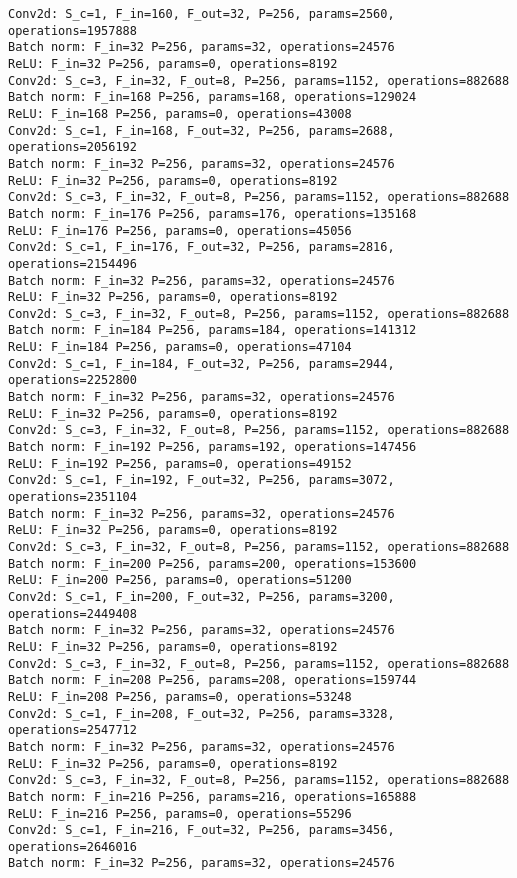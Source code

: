 \begin{Verbatim}[fontsize=\small]
Conv2d: S_c=1, F_in=160, F_out=32, P=256, params=2560, operations=1957888
Batch norm: F_in=32 P=256, params=32, operations=24576
ReLU: F_in=32 P=256, params=0, operations=8192
Conv2d: S_c=3, F_in=32, F_out=8, P=256, params=1152, operations=882688
Batch norm: F_in=168 P=256, params=168, operations=129024
ReLU: F_in=168 P=256, params=0, operations=43008
Conv2d: S_c=1, F_in=168, F_out=32, P=256, params=2688, operations=2056192
Batch norm: F_in=32 P=256, params=32, operations=24576
ReLU: F_in=32 P=256, params=0, operations=8192
Conv2d: S_c=3, F_in=32, F_out=8, P=256, params=1152, operations=882688
Batch norm: F_in=176 P=256, params=176, operations=135168
ReLU: F_in=176 P=256, params=0, operations=45056
Conv2d: S_c=1, F_in=176, F_out=32, P=256, params=2816, operations=2154496
Batch norm: F_in=32 P=256, params=32, operations=24576
ReLU: F_in=32 P=256, params=0, operations=8192
Conv2d: S_c=3, F_in=32, F_out=8, P=256, params=1152, operations=882688
Batch norm: F_in=184 P=256, params=184, operations=141312
ReLU: F_in=184 P=256, params=0, operations=47104
Conv2d: S_c=1, F_in=184, F_out=32, P=256, params=2944, operations=2252800
Batch norm: F_in=32 P=256, params=32, operations=24576
ReLU: F_in=32 P=256, params=0, operations=8192
Conv2d: S_c=3, F_in=32, F_out=8, P=256, params=1152, operations=882688
Batch norm: F_in=192 P=256, params=192, operations=147456
ReLU: F_in=192 P=256, params=0, operations=49152
Conv2d: S_c=1, F_in=192, F_out=32, P=256, params=3072, operations=2351104
Batch norm: F_in=32 P=256, params=32, operations=24576
ReLU: F_in=32 P=256, params=0, operations=8192
Conv2d: S_c=3, F_in=32, F_out=8, P=256, params=1152, operations=882688
Batch norm: F_in=200 P=256, params=200, operations=153600
ReLU: F_in=200 P=256, params=0, operations=51200
Conv2d: S_c=1, F_in=200, F_out=32, P=256, params=3200, operations=2449408
Batch norm: F_in=32 P=256, params=32, operations=24576
ReLU: F_in=32 P=256, params=0, operations=8192
Conv2d: S_c=3, F_in=32, F_out=8, P=256, params=1152, operations=882688
Batch norm: F_in=208 P=256, params=208, operations=159744
ReLU: F_in=208 P=256, params=0, operations=53248
Conv2d: S_c=1, F_in=208, F_out=32, P=256, params=3328, operations=2547712
Batch norm: F_in=32 P=256, params=32, operations=24576
ReLU: F_in=32 P=256, params=0, operations=8192
Conv2d: S_c=3, F_in=32, F_out=8, P=256, params=1152, operations=882688
Batch norm: F_in=216 P=256, params=216, operations=165888
ReLU: F_in=216 P=256, params=0, operations=55296
Conv2d: S_c=1, F_in=216, F_out=32, P=256, params=3456, operations=2646016
Batch norm: F_in=32 P=256, params=32, operations=24576

\end{Verbatim}

